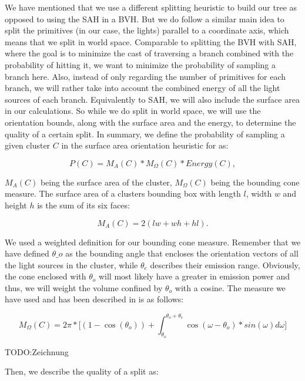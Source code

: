 We have mentioned that we use a different splitting heuristic to build our tree as opposed to using the SAH in a BVH. But we do follow a similar main idea to split the primitives (in our case, the lights) parallel to a coordinate axis, which means that we split in world space. Comparable to splitting the BVH with SAH, where the goal is to minimize the cast of traversing a branch combined with the probability of hitting it, we want to minimize the probability of sampling a branch here. Also, instead of only regarding the number of primitives for each branch, we will rather take into account the combined energy of all the light sources of each branch. Equivalently to SAH, we will also include the surface area in our calculations. So while we do split in world space, we will use the orientation bounds, along with the surface area and the energy, to determine the quality of a certain split. In summary, we define the probability of sampling a given cluster $C$ in the surface area orientation heuristic for as:

\begin{equation}
P(C) = M_A(C) * M_\Omega(C) * Energy(C),
\end{equation}

$M_A(C)$ being the surface area of the cluster, $M_\Omega(C)$ being the bounding cone measure. The surface area of a clusters bounding box with length $l$, width $w$ and height $h$ is the sum of its six faces:

\begin{equation}
M_A(C) = 2(lw + wh + hl).
\end{equation}

We used a weighted definition for our bounding cone measure. Remember that we have defined $\theta\_o$ as the bounding angle that encloses the orientation vectors of all the light sources in the cluster, while $\theta_e$ describes their emission range. Obviously, the cone enclosed with $\theta_o$ will most likely have a greater in emission power and thus, we will weight the volume confined by $\theta_o$ with a cosine. The measure we have used and has been described in \Cite{MLS} is as follows:

\begin{equation}\label{eq:cone}
M_\Omega(C) = 2\pi * \bigg[(1-\cos(\theta_o)) + \int_{\theta_o}^{\theta_o + \theta_e}\cos(\omega - \theta_o) * sin(\omega)d\omega\bigg]
\end{equation} 

TODO:Zeichnung

Then, we describe the quality of a split as:

